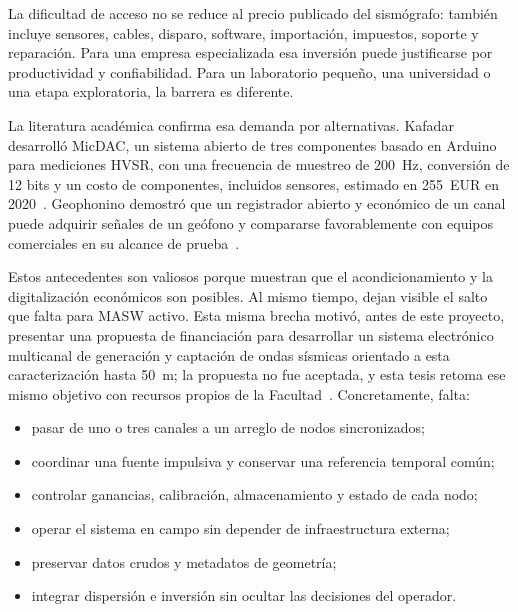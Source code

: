 La dificultad de acceso no se reduce al precio publicado del sismógrafo: también incluye
sensores, cables, disparo, software, importación, impuestos, soporte y reparación. Para
una empresa especializada esa inversión puede justificarse por productividad y
confiabilidad. Para un laboratorio pequeño, una universidad o una etapa exploratoria,
la barrera es diferente.

La literatura académica confirma esa demanda por alternativas. Kafadar desarrolló
MicDAC, un sistema abierto de tres componentes basado en Arduino para mediciones HVSR,
con una frecuencia de muestreo de \SI{200}{\hertz}, conversión de 12 bits y un costo de
componentes, incluidos sensores, estimado en 255~EUR en 2020~\cite{Kafadar2020}.
Geophonino demostró que un registrador abierto y económico de un canal puede adquirir
señales de un geófono y compararse favorablemente con equipos comerciales en su alcance
de prueba~\cite{Llorens2016}.

Estos antecedentes son valiosos porque muestran que el acondicionamiento y la
digitalización económicos son posibles. Al mismo tiempo, dejan visible el salto que
falta para MASW activo. Esta misma brecha motivó, antes de este proyecto, presentar una
propuesta de financiación para desarrollar un sistema electrónico multicanal de
generación y captación de ondas sísmicas orientado a esta caracterización hasta
\SI{50}{\meter}; la propuesta no fue aceptada, y esta tesis retoma ese mismo objetivo con
recursos propios de la Facultad~\cite{PINV01317}. Concretamente, falta:

\begin{itemize}
    \item pasar de uno o tres canales a un arreglo de nodos sincronizados;
    \item coordinar una fuente impulsiva y conservar una referencia temporal común;
    \item controlar ganancias, calibración, almacenamiento y estado de cada nodo;
    \item operar el sistema en campo sin depender de infraestructura externa;
    \item preservar datos crudos y metadatos de geometría;
    \item integrar dispersión e inversión sin ocultar las decisiones del operador.
\end{itemize}

